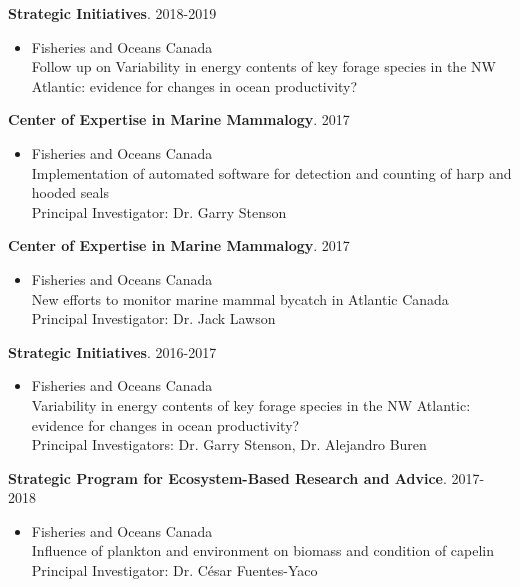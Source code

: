 \documentclass{res}
\begin{document}
\begin{resume}
\textbf{Strategic Initiatives}. 2018-2019
\begin{itemize} %
	\item[] Fisheries and Oceans Canada\\
Follow up on Variability in energy contents of key forage species in the NW Atlantic: evidence for changes in ocean productivity?
\end{itemize}

\textbf{Center of Expertise in Marine Mammalogy}. 2017
\begin{itemize} %
	\item[] Fisheries and Oceans Canada\\
Implementation of automated software for detection and counting of harp and hooded seals \\
Principal Investigator: Dr. Garry Stenson
\end{itemize}

\textbf{Center of Expertise in Marine Mammalogy}. 2017
\begin{itemize} %
	\item[] Fisheries and Oceans Canada\\
New efforts to monitor marine mammal bycatch in Atlantic Canada\\
Principal Investigator: Dr. Jack Lawson
\end{itemize}

\textbf{Strategic Initiatives}. 2016-2017
\begin{itemize} %
	\item[]Fisheries and Oceans Canada\\
Variability in energy contents of key forage species in the NW Atlantic: evidence for changes in ocean productivity?\\
Principal Investigators: Dr. Garry Stenson, Dr. Alejandro Buren

\end{itemize}

\textbf{Strategic Program for Ecosystem-Based Research and Advice}. 2017-2018
\begin{itemize} %
	\item[]Fisheries and Oceans Canada\\
Influence of plankton and environment on biomass and condition of capelin\\
Principal Investigator: Dr. César Fuentes-Yaco
\end{itemize}


\end{resume}
\end{document}
